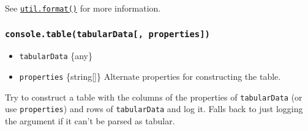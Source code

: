 \begin{Shaded}
\begin{Highlighting}[]
\OperatorTok{=} \OperatorTok{;}
\NormalTok{(}\OperatorTok{,}\OperatorTok{;}
\NormalTok{(}\OperatorTok{,}\OperatorTok{;}
\end{Highlighting}
\end{Shaded}

See \href{util.md\#utilformatformat-args}{\texttt{util.format()}} for
more information.

\subsubsection{\texorpdfstring{\texttt{console.table(tabularData{[},\ properties{]})}}{console.table(tabularData{[}, properties{]})}}\label{console.tabletabulardata-properties}

\begin{itemize}
\tightlist
\item
  \texttt{tabularData} \{any\}
\item
  \texttt{properties} \{string{[}{]}\} Alternate properties for
  constructing the table.
\end{itemize}

Try to construct a table with the columns of the properties of
\texttt{tabularData} (or use \texttt{properties}) and rows of
\texttt{tabularData} and log it. Falls back to just logging the argument
if it can't be parsed as tabular.

